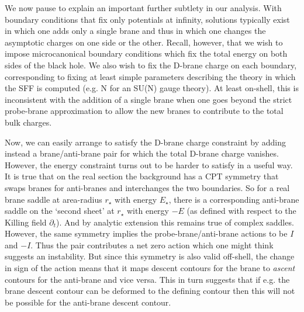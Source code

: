 \documentclass[11pt]{article}
\begin{document}
We now pause to explain an important further subtlety in our analysis.
With boundary conditions that fix only potentials at infinity, solutions typically exist in which one adds only a single brane and thus in which one changes the asymptotic charges on one side or the other.
Recall, however, that we wish to impose microcanonical boundary conditions which fix the total energy on both sides of the black hole.  
We also wish to fix the D-brane charge on each boundary, corresponding to fixing at least simple parameters describing the theory in which the SFF is computed (e.g. N for an SU(N) gauge theory).  
At least on-shell, this is inconsistent with the addition of a single brane when one goes beyond the strict probe-brane approximation to allow the new branes to contribute to the total bulk charges.

Now, we can easily arrange to satisfy the D-brane charge constraint by adding instead a brane/anti-brane pair for which the total D-brane charge vanishes.  
However, the energy constraint turns out to be harder to satisfy in a useful way.  
It is true that on the real section the background has a CPT symmetry that swaps branes for anti-branes and interchanges the two boundaries.  
So for a real brane saddle at area-radius $r_\star$ with energy $E_\star$, there is a corresponding anti-brane saddle on the `second sheet' at $r_\star$ with energy $-E$ (as defined with respect to the Killing field $\partial_t$).  
And by analytic extension this remains true of complex saddles.  
However, the same symmetry implies the probe-brane/anti-brane actions to be $I$ and $-I$.  
Thus the pair contributes a net zero action which one might think suggests an instability.  
But since this symmetry is also valid off-shell, the change in sign of the action means that it maps descent contours for the brane to {\it ascent} contours for the anti-brane and vice versa.  
This in turn suggests that if e.g. the brane descent contour can be deformed to the defining contour then this will not be possible for the anti-brane descent contour.
\end{document}

